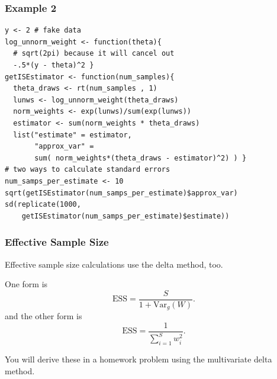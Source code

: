 \documentclass{beamer}
\begin{document}
\begin{frame}[fragile]
\frametitle{Example 2}

\begin{verbatim}
y <- 2 # fake data
log_unnorm_weight <- function(theta){ 
  # sqrt(2pi) because it will cancel out 
  -.5*(y - theta)^2 }
getISEstimator <- function(num_samples){
  theta_draws <- rt(num_samples , 1)
  lunws <- log_unnorm_weight(theta_draws)
  norm_weights <- exp(lunws)/sum(exp(lunws))
  estimator <- sum(norm_weights * theta_draws)
  list("estimate" = estimator, 
       "approx_var" = 
       sum( norm_weights*(theta_draws - estimator)^2) ) }
# two ways to calculate standard errors
num_samps_per_estimate <- 10
sqrt(getISEstimator(num_samps_per_estimate)$approx_var)  
sd(replicate(1000, 
    getISEstimator(num_samps_per_estimate)$estimate)) 
\end{verbatim}


\end{frame}

% 
% 
% 
% 


\begin{frame}[fragile]
\frametitle{Effective Sample Size}

Effective sample size calculations use the delta method, too. 
\newline

One form is 
$$
\textrm{ESS} = \frac{S}{1 + \textrm{Var}_g(W)}.
$$
and the other form is 
$$
\textrm{ESS} = \frac{1}{\sum_{i=1}^S w_i^2}.
$$

You will derive these in a homework problem using the multivariate delta method.


\end{frame}
\end{document}

